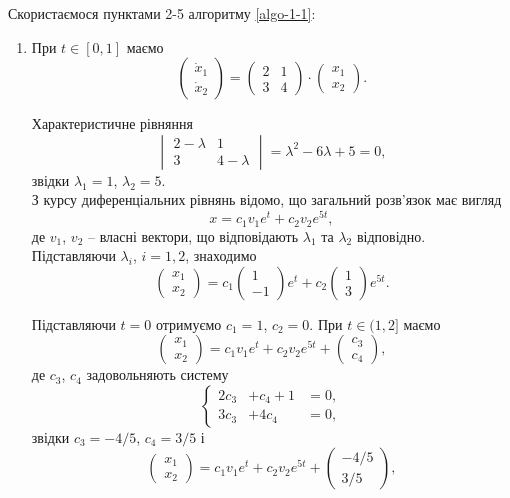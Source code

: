 \begin{solution}
    Скористаємося пунктами 2-5 алгоритму \ref{algo-1-1}:
    
	\begin{enumerate}
		\item При $t \in [0, 1]$ маємо 
		\[ \begin{pmatrix} \dot x_1 \\ \dot x_2 \end{pmatrix} = \begin{pmatrix}	2 & 1 \\ 3 & 4 \end{pmatrix} \cdot \begin{pmatrix} x_1 \\ x_2 \end{pmatrix}.\]
		
		Характеристичне рівняння 
		\[ \begin{vmatrix} 2 - \lambda & 1 \\ 3 & 4 - \lambda \end{vmatrix} = \lambda^2 - 6\lambda + 5 = 0,\]
		звідки $\lambda_1 = 1$, $\lambda_2 = 5$.\\
		
		З курсу диференціальних рівнянь відомо, що загальний розв'язок має вигляд
		\[ x = c_1 v_1 e^t + c_2 v_2 e^{5t},\]
		де $v_1$, $v_2$ -- власні вектори, що відповідають $\lambda_1$ та $\lambda_2$ відповідно. Підставляючи $\lambda_i$, $i=1,2$, знаходимо
		\[ \begin{pmatrix} x_1 \\ x_2 \end{pmatrix} = c_1 \begin{pmatrix} 1 \\ -1 \end{pmatrix} e^t + c_2 \begin{pmatrix} 1 \\ 3 \end{pmatrix} e^{5t}.\]
		
		Підставляючи $t = 0$ отримуємо $c_1 = 1$, $c_2 = 0$. При $t \in (1, 2]$ маємо 
		\[ \begin{pmatrix} x_1 \\ x_2 \end{pmatrix} = c_1 v_1 e^t + c_2 v_2 e^{5t} + \begin{pmatrix} c_3 \\ c_4 \end{pmatrix}, \]
		де $c_3$, $c_4$ задовольняють систему 
		\[
			\left\{
				\begin{aligned}
					2c_3 &+ c_4 + 1 &= 0, \\
					3c_3 &+ 4c_4 &= 0,
				\end{aligned}
			\right.
		\]
		звідки $c_3 = -4/5$, $c_4 = 3/5$ і 
		\[ \begin{pmatrix} x_1 \\ x_2 \end{pmatrix} = c_1 v_1 e^t + c_2 v_2 e^{5t} + \begin{pmatrix} -4/5 \\ 3/5 \end{pmatrix},\]
		

\end{enumerate}
\end{solution}

